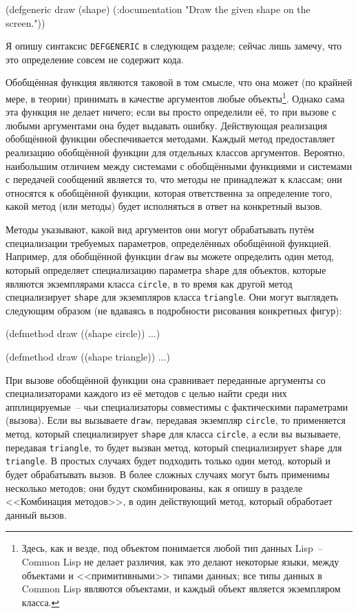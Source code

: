 \begin{myverb}
  (defgeneric draw (shape)
    (:documentation "Draw the given shape on the screen."))
\end{myverb}

Я опишу синтаксис \lstinline{DEFGENERIC} в следующем разделе; сейчас лишь замечу, что это
определение совсем не содержит кода.

Обобщённая функция являются таковой в том смысле, что она может (по крайней мере, в теории)
принимать в качестве аргументов любые объекты\footnote{Здесь, как и везде, под объектом
  понимается любой тип данных Lisp~-- Common Lisp не делает различия, как это делают
  некоторые языки, между объектами и <<примитивными>> типами данных; все типы данных в
  Common Lisp являются объектами, и каждый объект является экземпляром класса.}.  Однако
сама эта функция не делает ничего; если вы просто определили её, то при вызове с любыми
аргументами она будет выдавать ошибку. Действующая реализация обобщённой функции
обеспечивается методами. Каждый метод предоставляет реализацию обобщённой функции для
отдельных классов аргументов.  Вероятно, наибольшим отличием между системами с обобщёнными
функциями и системами с передачей сообщений является то, что методы не принадлежат к
классам; они относятся к обобщённой функции, которая ответственна за определение того,
какой метод (или методы) будет исполняться в ответ на конкретный вызов.

Методы указывают, какой вид аргументов они могут обрабатывать путём специализации
требуемых параметров, определённых обобщённой функцией.  Например, для обобщённой функции
\lstinline{draw} вы можете определить один метод, который определяет специализацию параметра
\lstinline{shape} для объектов, которые являются экземплярами класса \lstinline{circle}, в то время
как другой метод специализирует \lstinline{shape} для экземпляров класса \lstinline{triangle}.  Они
могут выглядеть следующим образом (не вдаваясь в подробности рисования конкретных фигур):

\begin{myverb}
  (defmethod draw ((shape circle))
    ...)

  (defmethod draw ((shape triangle))
    ...)
\end{myverb}

При вызове обобщённой функции она сравнивает переданные аргументы со специализаторами
каждого из её методов с целью найти среди них апплицируемые~-- чьи специализаторы
совместимы с фактическими параметрами (вызова). Если вы вызываете \lstinline{draw}, передавая
экземпляр \lstinline{circle}, то применяется метод, который специализирует \lstinline{shape} для
класса \lstinline{circle}, а если вы вызываете, передавая \lstinline{triangle}, то будет вызван
метод, который специализирует \lstinline{shape} для \lstinline{triangle}.  В простых случаях будет
подходить только один метод, который и будет обрабатывать вызов.  В более сложных случаях
могут быть применимы несколько методов; они будут скомбинированы, как я опишу в разделе
<<Комбинация методов>>, в один действующий метод, который обработает данный вызов.

